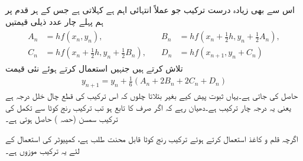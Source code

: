 اس سے بھی زیادہ درست ترکیب جو عملاً انتہائی اہم ہے  کہلاتی ہے جس کے ہر قدم پر ہم پہلے چار عدد ذیلی قیمتیں
\begin{gather}
\begin{aligned}\label{مساوات_اعدادی_رنج_کوٹا_الف}
A_n&=hf(x_n,y_n),\\
C_n&=hf(x_n+\tfrac{1}{2}h,y_n+\tfrac{1}{2}B_n),
\end{aligned}
\quad 
\begin{aligned}
B_n&=hf(x_n+\tfrac{1}{2}h,y_n+\tfrac{1}{2}A_n),\\
D_n&=hf(x_{n+1},y_n+C_n)
\end{aligned}
\end{gather}
 تلاش کرتے ہیں جنہیں استعمال کرتے ہوئے نئی قیمت
\begin{align}\label{مثال_اعدادی_ترکیب_یولر_ب}
y_{n+1}=y_n+\tfrac{1}{6}(A_n+2B_n+2C_n+D_n)
\end{align}
حاصل کی جاتی ہے۔یہاں ثبوت پیش کیے بغیر بتلاتا چلوں کہ اس ترکیب کی قطع چال خلل درجہ  ہے یعنی یہ درجہ چار ترکیب  ہے۔دھیان رہے کہ اگر  صرف  کا تابع ہو تب ترکیب رنج کوٹا سے تکمل کی ترکیب سمسن (حصہ ) حاصل ہوتی ہے۔

اگرچہ قلم و کاغذ استعمال کرتے ہوئے ترکیب رنج کوٹا قابل محنت طلب ہے، کمپیوٹر کی استعمال کے لئے یہ ترکیب موزوں ہے۔


